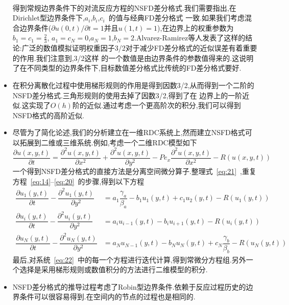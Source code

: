 \documentclass[a4paper,cs4size,adobefonts,cm-default,no-math]{ctexart}
\begin{document}
\begin{itemize}
\begin{align*}
\end{align*}
得到常规边界条件下的对流反应方程的NSFD差分格式.我们需要指出,在Dirichlet型边界条件下,$a_i$,$b_i$,$c_i$~的值与经典FD差分格式
一致.如果我们考虑混合边界条件($\partial u(0,t)/\partial t=1$并且$u(1,t)=1$),在边界上的权重参数为$b_1=c_1=\frac{2}{3}$,
$a_1=c_N=0$,$a_N=1$,$b_N=2$.Alvarez-Ramirez等人发表了这样的结论:广泛的数值模拟证明权重因子3/2对于减少FD差分格式的近似误差有着重要的作用.我们注意到,3/2这样
的一个数值是由边界条件的参数值得来的.这说明了在不同类型的边界条件下,目标数值差分格式比传统的FD差分格式要好.
\item 在积分离散化过程中使用梯形规则的作用是得到因数3/2,从而得到一个二阶的NSFD差分格式.三角形规则的使用去掉了因数3/2,得到了在
边界上的一阶近似.这实现了$O(h)$阶的近似.通过考虑一个更高阶次的积分,我们可以得到NSFD格式的高阶近似.
\item 尽管为了简化论述,我们的分析建立在一维RDC系统上,然而建立NSFD格式可以拓展到二维或三维系统.例如,考虑一个二维RDC模型如下
\begin{equation}\label{eq:21}
 \dfrac{\partial u(x,y,t)}{\partial t}=\dfrac{\partial^2 u(x,y,t)}{\partial x^2}+
                                       \dfrac{\partial^2 u(x,y,t)}{\partial y^2}-
                                       Pe_x\dfrac{\partial^2 u(x,y,t)}{\partial x^2}
                                       -R(u(x,y,t))
\end{equation}
一个得到NSFD差分格式的直接方法是分离空间微分算子.整理式~\ref{eq:21}~,重复方程~\ref{eq:14}--\ref{eq:20}~的步骤,得到以下方程
\begin{equation}\label{eq:22}
 \begin{aligned}
  \dfrac{\partial u_1(y,t)}{\partial t}-\dfrac{\partial^2 u_1(y,t)}{\partial y^2} &=
  a_1\dfrac{\gamma_a}{\beta_a}-b_1 u_1(y,t)+c_1 u_2(y,t)-R(u_1(y,t)) \\
  \dfrac{\partial u_i(y,t)}{\partial t}-\dfrac{\partial^2 u_i(y,t)}{\partial y^2} &=
  a_i u_{i-1}(y,t)-b_i u_{i+1}(y,t)-R(u_i(y,t)) \\
  \dfrac{\partial u_N(y,t)}{\partial t}-\dfrac{\partial^2 u_N(y,t)}{\partial y^2} &=
  a_Nu_{N-1}(y,t)-b_Nu_N(y,t)+c_N\dfrac{\gamma_b}{\beta_b}-R(u_N(y,t))
 \end{aligned}
\end{equation}
最后,对系统~\ref{eq:22}~中的每一个方程进行迭代计算,得到常微分方程组.另外一个选择是采用梯形规则或数值积分的方法进行二维模型的积分.
\item NSFD差分格式的推导过程考虑了Robin型边界条件.依赖于反应过程历史的边界条件可以很容易得到.在空间内的节点的过程也是相同的.
\end{itemize}
\end{document}

